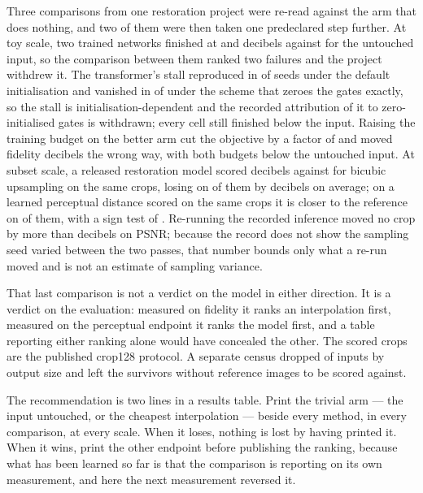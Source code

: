 Three comparisons from one restoration project were re-read against the arm that
does nothing, and two of them were then taken one predeclared step further. At
toy scale, two trained networks finished at \ToyConv{} and \ToyTrans{} decibels
against \ToyDegraded{} for the untouched input, so the comparison between them
ranked two failures and the project withdrew it. The transformer's stall
reproduced in \InitDefaultStall{} of \InitSeeds{} seeds under the default
initialisation and vanished in \InitZeroEscape{} of \InitSeeds{} under the
scheme that zeroes the gates exactly, so the stall is initialisation-dependent
and the recorded attribution of it to zero-initialised gates is withdrawn; every
cell still finished below the input. Raising the training budget \BudgetFold{}
on the better arm cut the objective by a factor of \ToyLossDrop{} and moved
fidelity \ToyLongRegression{} decibels the wrong way, with both budgets below
the untouched input. At subset scale, a released restoration model scored
\MethodPSNR{} decibels against \BicubicPSNR{} for bicubic upsampling on the same
\SubsetN{} crops, losing on \LossesBicubic{} of them by \GapBicubicAbs{}
decibels on average; on a learned perceptual distance scored on the same crops
it is closer to the reference on \LpipsWins{} of them, with a sign test of
\LpipsSignP{}. Re-running the recorded inference moved no crop by more than
\NoiseMax{} decibels on PSNR; because the record does not show the sampling
seed varied between the two passes, that number bounds only what a re-run moved
and is not an estimate of sampling variance.

That last comparison is not a verdict on the model in either direction. It is a
verdict on the evaluation: measured on fidelity it ranks an interpolation first,
measured on the perceptual endpoint it ranks the model first, and a table
reporting either ranking alone would have concealed the other. The scored
\SubsetN{} crops are the published crop128 protocol. A separate census dropped
\CensusSkipped{} of \CensusTotal{} inputs by output size and left the
\CensusRan{} survivors without reference images to be scored against.

The recommendation is two lines in a results table. Print the trivial arm --- the
input untouched, or the cheapest interpolation --- beside every method, in every
comparison, at every scale. When it loses, nothing is lost by having printed it.
When it wins, print the other endpoint before publishing the ranking, because
what has been learned so far is that the comparison is reporting on its own
measurement, and here the next measurement reversed it.

